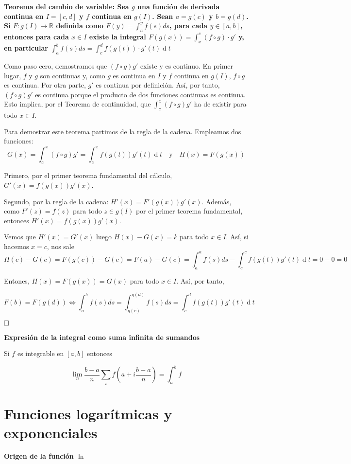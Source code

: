 \documentclass[a4paper]{article}
\renewcommand{\d}[1]{\ensuremath{\operatorname{d}\!{#1}}}
\newcommand{\qed}{\begin{flushright}
		{$\newline\square$}
	\end{flushright}}
\begin{document}
	
\textbf{Teorema del cambio de variable: Sea $g$ una función de derivada continua en $I = [c,d]$ y $f$ continua en $g(I)$. Sean $a=g(c)$ y $b=g(d)$. Si $F:g(I)\rightarrow\mathbb{R}$ definida como $F(y) = \int_a^yf(s)ds$, para cada $y\in[a,b]$, entonces para cada $x\in I$ existe la integral $F(g(x)) = \int_x^c (f\circ g)\cdot g'$ y, en particular $\int_a^bf(s)ds = \int_c^df(g(t))\cdot g'(t) \d t$}

Como paso cero, demostramos que $(f\circ g)g'$ existe y es continuo. En primer lugar, $f$ y $g$ son continuas y, como $g$ es continua en $I$ y $f$ continua en $g(I)$, $f\circ g$ es continua. Por otra parte, $g'$ es continua por definición. Así, por tanto, $(f \circ g)g'$ es continua porque el producto de dos funciones continuas es continua. Esto implica, por el Teorema de continuidad, que $\int_c^x (f \circ g)g'$ ha de existir para todo $x\in I$.

Para demostrar este teorema partimos de la regla de la cadena. Empleamos dos funciones:
$$G(x) =  \int_c^x(f \circ g)g' = \int_c^xf(g(t))g'(t)\d t \quad \text{y} \quad H(x) = F(g(x))$$ 

Primero, por el primer teorema fundamental del cálculo, $G'(x) = f(g(x))g'(x)$. 

Segundo, por la regla de la cadena: $H'(x) = F'(g(x))g'(x)$. Además, como $F'(z) = f(z)$ para todo $z\in g(I)$ por el primer teorema fundamental, entonces $H'(x) = f(g(x))g'(x)$.

Vemos que $H'(x) = G'(x)$ luego $H(x) - G(x) = k$ para todo $x\in I$. Así, si hacemos $x=c$, nos sale
$$H(c) - G(c) = F(g(c)) - G(c) = F(a) - G(c) = \int_a^a f(s) ds - \int_c^c f(g(t))g'(t)\d t = 0 - 0 = 0$$

Entones, $H(x) = F(g(x)) = G(x)$ para todo $x \in I$. Así, por tanto,

$$F(b) = F(g(d)) \iff \int_a^b f(s)ds = \int_{g(c)}^{g(d)} f(s)ds = \int_c^df(g(t))g'(t)\d t$$ \qed

\textbf{Expresión de la integral como suma infinita de sumandos}

Si $f$ es integrable en $[a,b]$ entonces 

$$\lim_n \frac{b-a}{n} \sum_i f\left(a+i\frac{b-a}{n}\right) = \int_a^bf$$

\section{Funciones logarítmicas y exponenciales}

\textbf{Origen de la función $\ln$}
\end{document}

